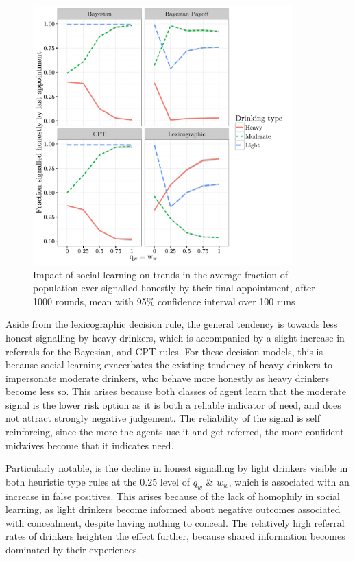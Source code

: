 \begin{figure}[H]
\includegraphics[width=100mm]{figures/honesty_sharing}
\caption{Impact of social learning on trends in the average fraction of population ever signalled honestly by their final appointment, after 1000 rounds, mean with 95\% confidence interval over 100 runs}
\label{fig:honest_sharing}
\end{figure}

Aside from the lexicographic decision rule, the general tendency is towards less honest signalling by heavy drinkers, which is accompanied by a slight increase in referrals for the Bayesian, and \ac{CPT} rules. For these decision models, this is because social learning exacerbates the existing tendency of heavy drinkers to impersonate moderate drinkers, who behave more honestly as heavy drinkers become less so. This arises because both classes of agent learn that the moderate signal is the lower risk option as it is both a reliable indicator of need, and does not attract strongly negative judgement. The reliability of the signal is self reinforcing, since the more the agents use it and get referred, the more confident midwives become that it indicates need.

Particularly notable, is the decline in honest signalling by light drinkers visible in both heuristic type rules at the 0.25 level of \(q_{w}\) \& \(w_{w}\), which is associated with an increase in false positives. This arises because of the lack of homophily in social learning, as light drinkers become informed about negative outcomes associated with concealment, despite having nothing to conceal. The relatively high referral rates of drinkers heighten the effect further, because shared information becomes dominated by their experiences. 

